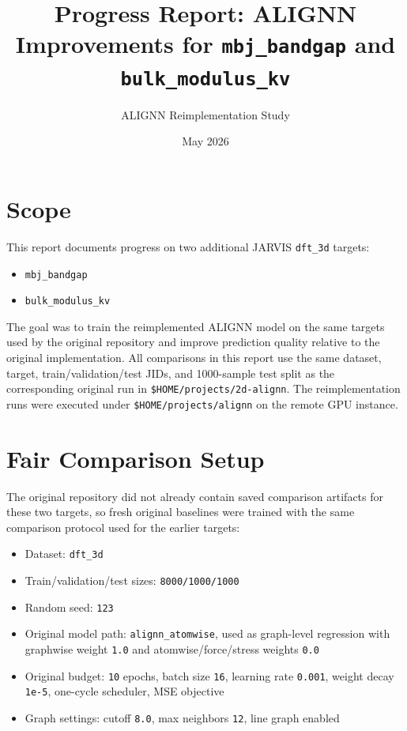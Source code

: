 \documentclass[11pt]{article}
\title{Progress Report: ALIGNN Improvements for \texttt{mbj\_bandgap} and \texttt{bulk\_modulus\_kv}}
\author{ALIGNN Reimplementation Study}
\date{May 2026}
\begin{document}
\maketitle

\section{Scope}

This report documents progress on two additional JARVIS \texttt{dft\_3d} targets:
\begin{itemize}
  \item \texttt{mbj\_bandgap}
  \item \texttt{bulk\_modulus\_kv}
\end{itemize}

The goal was to train the reimplemented ALIGNN model on the same targets used by the original repository and improve prediction quality relative to the original implementation.  All comparisons in this report use the same dataset, target, train/validation/test JIDs, and 1000-sample test split as the corresponding original run in \texttt{\$HOME/projects/2d-alignn}.  The reimplementation runs were executed under \texttt{\$HOME/projects/alignn} on the remote GPU instance.

\section{Fair Comparison Setup}

The original repository did not already contain saved comparison artifacts for these two targets, so fresh original baselines were trained with the same comparison protocol used for the earlier targets:
\begin{itemize}
  \item Dataset: \texttt{dft\_3d}
  \item Train/validation/test sizes: \texttt{8000/1000/1000}
  \item Random seed: \texttt{123}
  \item Original model path: \texttt{alignn\_atomwise}, used as graph-level regression with graphwise weight \texttt{1.0} and atomwise/force/stress weights \texttt{0.0}
  \item Original budget: \texttt{10} epochs, batch size \texttt{16}, learning rate \texttt{0.001}, weight decay \texttt{1e-5}, one-cycle scheduler, MSE objective
  \item Graph settings: cutoff \texttt{8.0}, max neighbors \texttt{12}, line graph enabled
\end{itemize}
\end{document}
